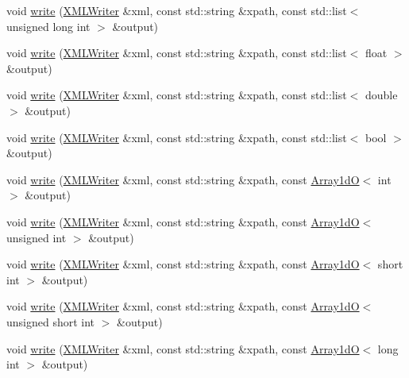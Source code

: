 \begin{DoxyCompactItemize}
\item 
void \mbox{\hyperlink{group__io_ga1cae344439dcb1355afb4b89f85e7e1b}{write}} (\mbox{\hyperlink{classADATXML_1_1XMLWriter}{X\+M\+L\+Writer}} \&xml, const std\+::string \&xpath, const std\+::list$<$ unsigned long int $>$ \&output)
\item 
void \mbox{\hyperlink{group__io_gaed1b6aaf88e89845ef30099ca6c5d933}{write}} (\mbox{\hyperlink{classADATXML_1_1XMLWriter}{X\+M\+L\+Writer}} \&xml, const std\+::string \&xpath, const std\+::list$<$ float $>$ \&output)
\item 
void \mbox{\hyperlink{group__io_ga9b4f1b7647f914a90edb448dc7fbb4e9}{write}} (\mbox{\hyperlink{classADATXML_1_1XMLWriter}{X\+M\+L\+Writer}} \&xml, const std\+::string \&xpath, const std\+::list$<$ double $>$ \&output)
\item 
void \mbox{\hyperlink{group__io_gaaeb2284c0481b6c39c20d3e2c283d933}{write}} (\mbox{\hyperlink{classADATXML_1_1XMLWriter}{X\+M\+L\+Writer}} \&xml, const std\+::string \&xpath, const std\+::list$<$ bool $>$ \&output)
\item 
void \mbox{\hyperlink{group__io_gaa6e09c5b36ae52183896f9566e971ca5}{write}} (\mbox{\hyperlink{classADATXML_1_1XMLWriter}{X\+M\+L\+Writer}} \&xml, const std\+::string \&xpath, const \mbox{\hyperlink{classADAT_1_1Array1dO}{Array1dO}}$<$ int $>$ \&output)
\item 
void \mbox{\hyperlink{group__io_ga32f158a165ed5de5be9e8391eb747012}{write}} (\mbox{\hyperlink{classADATXML_1_1XMLWriter}{X\+M\+L\+Writer}} \&xml, const std\+::string \&xpath, const \mbox{\hyperlink{classADAT_1_1Array1dO}{Array1dO}}$<$ unsigned int $>$ \&output)
\item 
void \mbox{\hyperlink{group__io_ga0490b2b22643afb2ca599baccded2556}{write}} (\mbox{\hyperlink{classADATXML_1_1XMLWriter}{X\+M\+L\+Writer}} \&xml, const std\+::string \&xpath, const \mbox{\hyperlink{classADAT_1_1Array1dO}{Array1dO}}$<$ short int $>$ \&output)
\item 
void \mbox{\hyperlink{group__io_gada32aa6101427e2983e6507da6d49ff2}{write}} (\mbox{\hyperlink{classADATXML_1_1XMLWriter}{X\+M\+L\+Writer}} \&xml, const std\+::string \&xpath, const \mbox{\hyperlink{classADAT_1_1Array1dO}{Array1dO}}$<$ unsigned short int $>$ \&output)
\item 
void \mbox{\hyperlink{group__io_ga22d9e5badf27f6d860eeba79ca71243f}{write}} (\mbox{\hyperlink{classADATXML_1_1XMLWriter}{X\+M\+L\+Writer}} \&xml, const std\+::string \&xpath, const \mbox{\hyperlink{classADAT_1_1Array1dO}{Array1dO}}$<$ long int $>$ \&output)
\item 

\end{DoxyCompactItemize}
